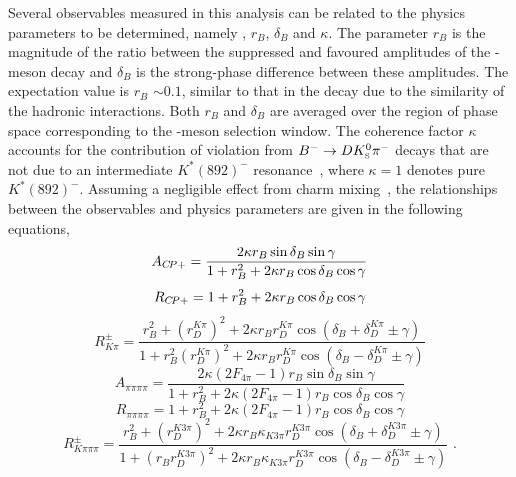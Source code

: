 Several \CP observables measured in this analysis can be related to the physics parameters to be determined, namely \Pgamma, $r_B$, $\delta_B$ and $\kappa$. The parameter $r_B$ is the magnitude of the ratio between the suppressed and favoured amplitudes of the \B-meson decay and $\delta_B$ is the strong-phase difference between these amplitudes. The expectation value is $r_B$ $\sim 0.1$, similar to that in the \decay{\Bm}{\D\Km} decay due to the similarity of the hadronic interactions. Both $r_B$ and $\delta_B$ are averaged over the region of \D\KS\pim phase space corresponding to the \Kstarm-meson selection window. The coherence factor $\kappa$ accounts for the contribution of \CP violation from ${{{B}^-}} \rightarrow D {{K}^0_{\mathrm{ \scriptscriptstyle S}}} {{\pi}^-}$ decays that are not due to an intermediate $K^*(892)^{-}$ resonance~\cite{Gronau2003198}, where $\kappa = 1$ denotes pure $K^*(892)^{-}$. Assuming a negligible effect from charm mixing~\cite{charmmixing}, the relationships between the \CP observables and physics parameters are given in the following equations,
\begin{equation}
A_{{C\!P}+} = \frac{2 \kappa r_B\sin\delta_B\sin\gamma}{1 + r_B^2 + 2 \kappa r_B\cos\delta_B\cos\gamma}
\label{exp_Acp}
\end{equation}
\begin{equation}
R_{{C\!P}+} = 1 + r_B^2 + 2 \kappa r_B\cos\delta_B\cos\gamma
\label{exp_Rcp}
\end{equation}
\begin{equation}
R^{\pm}_{K\pi} = \frac{r_B^2 + \left(r_D^{K\pi}\right)^2 + 2\kappa r_B r_D^{K\pi} \cos(\delta_B + \delta_D^{K\pi} \pm \gamma)}{1 + r_B^2\left(r_D^{K\pi}\right)^2 + 2\kappa r_B r_D^{K\pi} \cos(\delta_B - \delta_D^{K\pi} \pm \gamma)}
\label{exp_Rpm}
\end{equation}
\begin{equation}
A_{\pi\pi\pi\pi} = \frac{2 \kappa\left(2F_{4\pi} - 1\right) r_B\sin\delta_B\sin\gamma}{1 + r_B^2 + 2 \kappa\left(2F_{4\pi} - 1\right) r_B\cos\delta_B\cos\gamma}
\label{exp_A4pi}
\end{equation}
\begin{equation}
R_{\pi\pi\pi\pi} = 1 + r_B^2 + 2 \kappa\left(2F_{4\pi} - 1\right) r_B\cos\delta_B\cos\gamma
\label{exp_R4pi}
\end{equation}
\begin{equation}
R^{\pm}_{K\pi\pi\pi} = \frac{r_B^2 + \left(r_D^{K3\pi}\right)^2 + 2\kappa r_B \kappa_{K3\pi} r_D^{K3\pi} \cos(\delta_B + \delta_D^{K3\pi} \pm \gamma)}{1 + \left(r_Br_D^{K3\pi}\right)^2 + 2\kappa r_B \kappa_{K3\pi} r_D^{K3\pi} \cos(\delta_B - \delta_D^{K3\pi} \pm \gamma)} \text{ .}
\label{exp_Rpm4body}
\end{equation}
